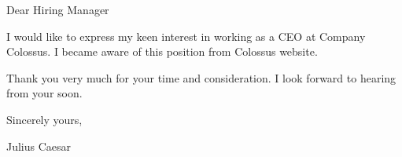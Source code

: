 \documentclass[a4paper,12pt,roman]{cover}
\begin{document}
\vspace{4em}

Dear Hiring Manager
\vspace{2\baselineskip}

I would like to express my keen interest in working as a CEO at Company Colossus. 
I became aware of this position from Colossus website.
\vspace{\baselineskip}

\lipsum[10]
\vspace{\baselineskip}

\lipsum[11]
\vspace{\baselineskip}

Thank you very much for your time and consideration. I look forward to hearing from your soon.
\vspace{2\baselineskip}

Sincerely yours,
\vspace{\baselineskip}

Julius Caesar
\end{document}
